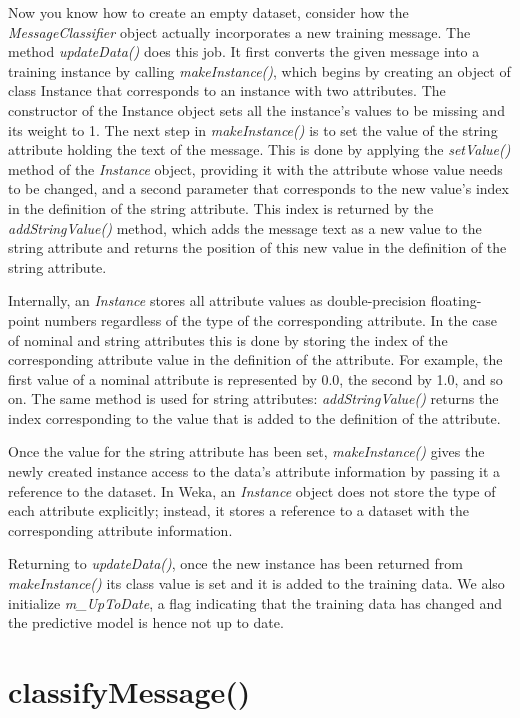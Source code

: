 Now you know how to create an empty dataset, consider how the
\textit{MessageClassifier} object actually incorporates a new training
message. The method \textit{updateData()} does this job. It first
converts the given message into a training instance by calling
\textit{makeInstance()}, which begins by creating an object of class
Instance that corresponds to an instance with two attributes. The
constructor of the Instance object sets all the instance’s values to
be missing and its weight to 1. The next step in
\textit{makeInstance()} is to set the value of the string attribute
holding the text of the message. This is done by applying the
\textit{setValue()} method of the \textit{Instance} object, providing
it with the attribute whose value needs to be changed, and a second
parameter that corresponds to the new value’s index in the definition
of the string attribute. This index is returned by the
\textit{addStringValue()} method, which adds the message text as a new
value to the string attribute and returns the position of this new
value in the definition of the string attribute.

Internally, an \textit{Instance} stores all attribute values as
double-precision floating-point numbers regardless of the type of the
corresponding attribute. In the case of nominal and string attributes
this is done by storing the index of the corresponding attribute value
in the definition of the attribute. For example, the first value of a
nominal attribute is represented by 0.0, the second by 1.0, and so
on. The same method is used for string attributes: \textit{addStringValue()}
returns the index corresponding to the value that is added to the
definition of the attribute.

Once the value for the string attribute has been set,
\textit{makeInstance()} gives the newly created instance access to the
data's attribute information by passing it a reference to the
dataset. In Weka, an \textit{Instance} object does not store the type
of each attribute explicitly; instead, it stores a reference to a
dataset with the corresponding attribute information.

Returning to \textit{updateData()}, once the new instance has been
returned from \textit{makeInstance()} its class value is set and it is
added to the training data. We also initialize \textit{m\_UpToDate}, a
flag indicating that the training data has changed and the predictive
model is hence not up to date.

\section{classifyMessage()}

